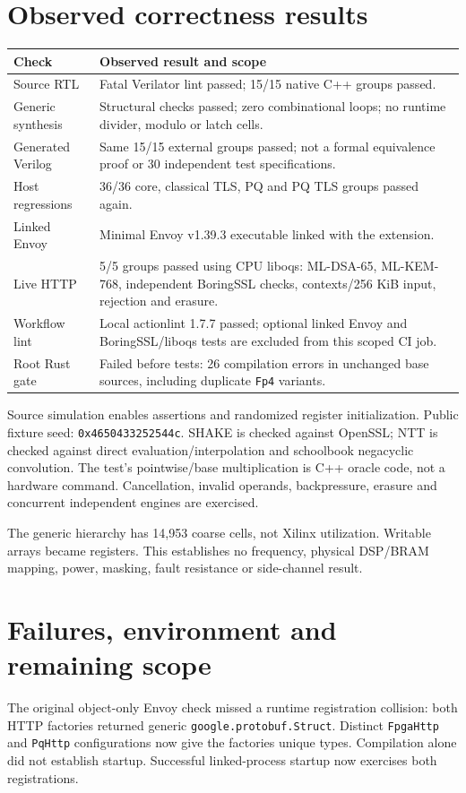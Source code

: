 \documentclass[10pt]{article}
\begin{document}
\section*{Observed correctness results}
\begin{tabularx}{\textwidth}{@{}lX@{}}
\toprule
Check & Observed result and scope \\
\midrule
Source RTL & Fatal Verilator lint passed; 15/15 native C++ groups passed. \\
Generic synthesis & Structural checks passed; zero combinational loops;
no runtime divider, modulo or latch cells. \\
Generated Verilog & Same 15/15 external groups passed; not a formal
equivalence proof or 30 independent test specifications. \\
Host regressions & 36/36 core, classical TLS, PQ and PQ TLS groups passed again. \\
Linked Envoy & Minimal Envoy v1.39.3 executable linked with the extension. \\
Live HTTP & 5/5 groups passed using CPU liboqs: ML-DSA-65, ML-KEM-768,
independent BoringSSL checks, contexts/256 KiB input, rejection and erasure. \\
Workflow lint & Local actionlint 1.7.7 passed; optional linked Envoy and
BoringSSL/liboqs tests are excluded from this scoped CI job. \\
Root Rust gate & Failed before tests: 26 compilation errors in unchanged
base sources, including duplicate \texttt{Fp4} variants. \\
\bottomrule
\end{tabularx}

Source simulation enables assertions and randomized register initialization.
Public fixture seed: \texttt{0x4650433252544c}. SHAKE is checked against
OpenSSL; NTT is checked against direct evaluation/interpolation and
schoolbook negacyclic convolution. The test's pointwise/base multiplication
is C++ oracle code, not a hardware command. Cancellation, invalid operands,
backpressure, erasure and concurrent independent engines are exercised.

The generic hierarchy has 14,953 coarse cells, not Xilinx utilization.
Writable arrays became registers. This establishes no frequency, physical
DSP/BRAM mapping, power, masking, fault resistance or side-channel result.

\section*{Failures, environment and remaining scope}
The original object-only Envoy check missed a runtime registration collision:
both HTTP factories returned generic \texttt{google.protobuf.Struct}.
Distinct \texttt{FpgaHttp} and \texttt{PqHttp} configurations now give the
factories unique types. Compilation alone did not establish startup.
Successful linked-process startup now exercises both registrations.
\end{document}

